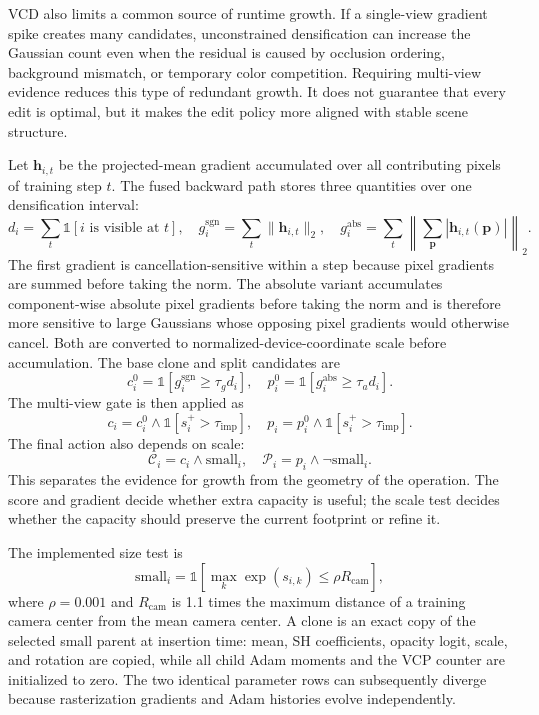 VCD also limits a common source of runtime growth. If a single-view gradient spike creates many candidates, unconstrained densification can increase the Gaussian count even when the residual is caused by occlusion ordering, background mismatch, or temporary color competition. Requiring multi-view evidence reduces this type of redundant growth. It does not guarantee that every edit is optimal, but it makes the edit policy more aligned with stable scene structure.

Let $\mathbf{h}_{i,t}$ be the projected-mean gradient accumulated over all contributing pixels of training step $t$. The fused backward path stores three quantities over one densification interval:
\begin{equation}
d_i=\sum_t \mathbb{1}[i\text{ is visible at }t],
\quad
g_i^{\mathrm{sgn}}=\sum_t\|\mathbf{h}_{i,t}\|_2,
\quad
g_i^{\mathrm{abs}}=\sum_t\left\|
\sum_{\mathbf{p}}|\mathbf{h}_{i,t}(\mathbf{p})|
\right\|_2 .
\end{equation}
The first gradient is cancellation-sensitive within a step because pixel gradients are summed before taking the norm. The absolute variant accumulates component-wise absolute pixel gradients before taking the norm and is therefore more sensitive to large Gaussians whose opposing pixel gradients would otherwise cancel. Both are converted to normalized-device-coordinate scale before accumulation. The base clone and split candidates are
\begin{equation}
c_i^0=
\mathbb{1}[g_i^{\mathrm{sgn}}\ge \tau_g d_i],
\quad
p_i^0=
\mathbb{1}[g_i^{\mathrm{abs}}\ge \tau_a d_i].
\end{equation}
The multi-view gate is then applied as
\begin{equation}
c_i=
c_i^0\land\mathbb{1}[s_i^{+}>\tau_{\mathrm{imp}}],
\quad
p_i=
p_i^0\land\mathbb{1}[s_i^{+}>\tau_{\mathrm{imp}}].
\end{equation}
The final action also depends on scale:
\begin{equation}
\mathcal{C}_i=c_i\land\mathrm{small}_i,
\quad
\mathcal{P}_i=p_i\land\neg\mathrm{small}_i.
\end{equation}
This separates the evidence for growth from the geometry of the operation. The score and gradient decide whether extra capacity is useful; the scale test decides whether the capacity should preserve the current footprint or refine it.

The implemented size test is
\begin{equation}
\mathrm{small}_i
=
\mathbb{1}\!\left[
\max_k \exp(s_{i,k})
\le
\rho R_{\mathrm{cam}}
\right],
\end{equation}
where $\rho=0.001$ and $R_{\mathrm{cam}}$ is 1.1 times the maximum distance of a training camera center from the mean camera center. A clone is an exact copy of the selected small parent at insertion time: mean, SH coefficients, opacity logit, scale, and rotation are copied, while all child Adam moments and the VCP counter are initialized to zero. The two identical parameter rows can subsequently diverge because rasterization gradients and Adam histories evolve independently.

